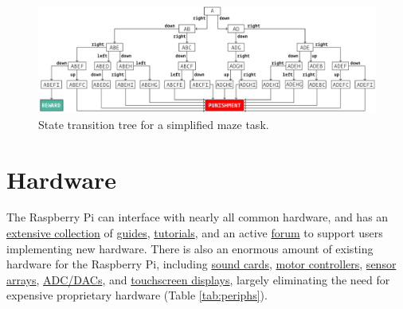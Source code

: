\begin{figure}[hb!]
\caption{State transition tree for a simplified maze task.}
\label{fig:fsmtree}
\includegraphics[]{figures/maze.pdf}
\end{figure}

\clearpage
\section{Hardware}
\label{sec:hardware}

The Raspberry Pi can interface with nearly all common hardware, and has an \href{https://www.raspberrypi.org/help/}{extensive collection} of \href{https://elinux.org/RPi_Guides}{guides}, \href{https://elinux.org/RPi_Tutorials}{tutorials}, and an active \href{https://www.raspberrypi.org/forums/}{forum} to support users implementing new hardware. There is also an enormous amount of existing hardware for the Raspberry Pi, including \href{https://www.hifiberry.com/}{sound cards}, \href{https://www.adafruit.com/product/2348}{motor controllers}, \href{https://www.digikey.com/product-detail/en/raspberry-pi/SENSE-HAT/1690-1013-ND/6196429}{sensor arrays}, \href{https://www.seeedstudio.com/Raspberry-Pi-High-Precision-AD-DA-Board-p-2765.html}{ADC/DACs}, and \href{https://www.digikey.com/product-detail/en/pimoroni-ltd/PIM369/1778-1221-ND/9521981}{touchscreen displays}, largely eliminating the need for expensive proprietary hardware (Table \ref{tab:periphs}). 

